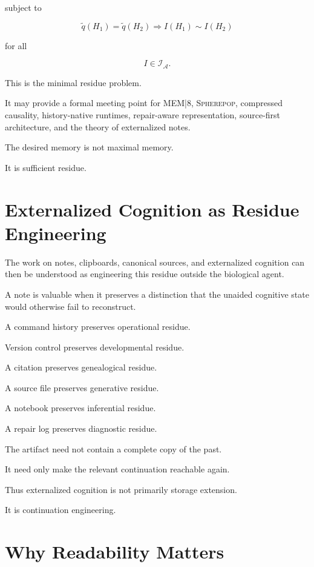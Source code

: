 \documentclass[11pt]{article}
\theoremstyle{remark}
\newcommand{\MEM}{\textsc{MEM|8}}
\newcommand{\Spherepop}{\textsc{Spherepop}}
\newcommand{\Adm}{\mathcal{A}}
\begin{document}
subject to

\begin{equation}
\tilde{q}(H_1)=\tilde{q}(H_2)
\Rightarrow
I(H_1)\sim I(H_2)
\end{equation}

for all

\begin{equation}
I\in\mathcal{I}_{\Adm}.
\end{equation}

This is the minimal residue problem.

It may provide a formal meeting point for \MEM{}, \Spherepop{}, compressed causality, history-native runtimes, repair-aware representation, source-first architecture, and the theory of externalized notes.

The desired memory is not maximal memory.

It is sufficient residue.

\section{Externalized Cognition as Residue Engineering}

The work on notes, clipboards, canonical sources, and externalized cognition can then be understood as engineering this residue outside the biological agent.

A note is valuable when it preserves a distinction that the unaided cognitive state would otherwise fail to reconstruct.

A command history preserves operational residue.

Version control preserves developmental residue.

A citation preserves genealogical residue.

A source file preserves generative residue.

A notebook preserves inferential residue.

A repair log preserves diagnostic residue.

The artifact need not contain a complete copy of the past.

It need only make the relevant continuation reachable again.

Thus externalized cognition is not primarily storage extension.

It is continuation engineering.

\section{Why Readability Matters}
\end{document}
